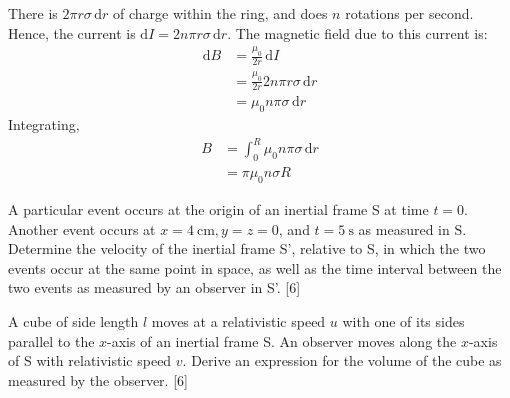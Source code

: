 \begin{solution}
\begin{subsolution}
\begin{center}
\begin{tikzpicture}[x=0.75pt,y=0.75pt,yscale=-1.2,xscale=1.2]
            
            \end{tikzpicture}
            
        \end{center}
        There is $2\pi r \sigma\,\mathrm{d}r$ of charge within the ring, and does $n$ rotations per second. Hence, the current is $\mathrm{d}I=2n\pi r \sigma\,\mathrm{d}r$. The magnetic field due to this current is:
        \begin{align*}
            \mathrm{d}B&=\frac{\mu_0}{2r}\,\mathrm{d}I\\
            &=\frac{\mu_0}{2r}2n\pi r \sigma\,\mathrm{d}r\\
            &=\mu_0 n\pi \sigma\,\mathrm{d}r
        \end{align*}
        Integrating,
        \begin{align*}
            B&=\int_{0}^{R}\mu_0 n\pi \sigma\,\mathrm{d}r\\
            &=\boxed{\pi\mu_0 n\sigma R}
        \end{align*}
    \end{subsolution}
\end{solution}

\begin{problem}
    \begin{subproblem}
        A particular event occurs at the origin of an inertial frame S at time $t=0$. Another event occurs at $x=\qty{4}{\cm}, y=z=0$, and $t=\qty{5}{\s}$ as measured in $\mathrm{S} .$ Determine the velocity of the inertial frame S', relative to S, in which the two events occur at the same point in space, as well as the time interval between the two events as measured by an observer in S'.
    \hfill{[6]}\end{subproblem}
    \begin{subproblem}
        A cube of side length $l$ moves at a relativistic speed $u$ with one of its sides parallel to the $x$-axis of an inertial frame S. An observer moves along the $x$-axis of S with relativistic speed $v$. Derive an expression for the volume of the cube as measured by the observer.
    \hfill{[6]}\end{subproblem}
\end{problem}